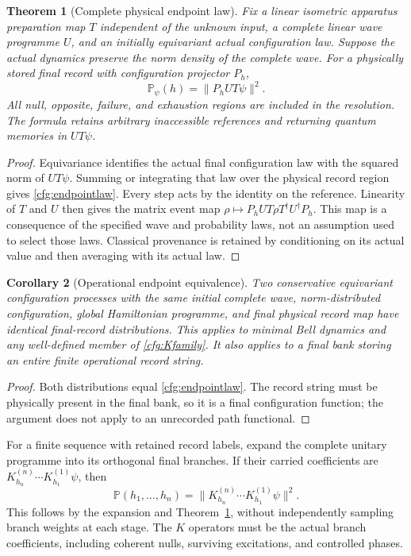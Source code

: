 \documentclass[11pt,oneside,openany]{book}
\newtheorem{theorem}{Theorem}[chapter]
\newtheorem{corollary}[theorem]{Corollary}
\theoremstyle{definition}
\theoremstyle{remark}\newtheorem{remark}[theorem]{Remark}
\begin{document}
\begin{theorem}[Complete physical endpoint law]\label{cfg:endpoint}
Fix a linear isometric apparatus preparation map $T$ independent of the unknown
input, a complete linear wave programme $U$, and an initially equivariant
actual configuration law. Suppose the actual dynamics preserve the norm
density of the complete wave. For a physically stored final record with
configuration projector $P_h$,
\begin{equation}
 \mathbb P_\psi(h)=\|P_hUT\psi\|^2.
 \label{cfg:endpointlaw}
\end{equation}
All null, opposite, failure, and exhaustion regions are included in the
resolution. The formula retains arbitrary inaccessible references and
returning quantum memories in $UT\psi$.
\end{theorem}
\begin{proof}
Equivariance identifies the actual final configuration law with the squared
norm of $UT\psi$. Summing or integrating that law over the physical record
region gives \eqref{cfg:endpointlaw}. Every step acts by the identity on the
reference. Linearity of $T$ and $U$ then gives the matrix event map
$\rho\mapsto P_hUT\rho T^\dagger U^\dagger P_h$.
This map is a consequence of the specified wave and probability laws, not
an assumption used to select those laws. Classical provenance is retained
by conditioning on its actual value and then averaging with its actual law.
\end{proof}

\begin{corollary}[Operational endpoint equivalence]\label{cfg:equivalence}
Two conservative equivariant configuration processes with the same initial
complete wave, norm-distributed configuration, global Hamiltonian programme,
and final physical record map have identical final-record distributions.
This applies to minimal Bell dynamics and any well-defined member of
\eqref{cfg:Kfamily}. It also applies to a final bank storing an entire
finite operational record string.
\end{corollary}
\begin{proof}
Both distributions equal \eqref{cfg:endpointlaw}. The record string must
be physically present in the final bank, so it is a final configuration
function; the argument does not apply to an unrecorded path functional.
\end{proof}

For a finite sequence with retained record labels, expand the complete
unitary programme into its orthogonal final branches. If their carried
coefficients are $K_{h_n}^{(n)}\cdots K_{h_1}^{(1)}\psi$, then
\[
 \mathbb P(h_1,\ldots,h_n)
 =\|K_{h_n}^{(n)}\cdots K_{h_1}^{(1)}\psi\|^2.
\]
This follows by the expansion and Theorem~\ref{cfg:endpoint}, without
independently sampling branch weights at each stage.
The $K$ operators must be the actual branch coefficients, including
coherent nulls, surviving excitations, and controlled phases.
\end{document}
